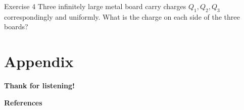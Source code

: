 \documentclass{beamer}
\begin{document}
\begin{frame}{Exercise 4}
Three infinitely large metal board carry charges $Q_1, Q_2, Q_3$ correspondingly 
and uniformly. What is the charge on each side of the three boards? 

\begin{figure}[H]
	\centering
\end{figure}
\end{frame}





\section{Appendix}

\begin{frame}
    \begin{center}
        \LARGE\bf Thank for listening!
    \end{center}
	
\end{frame}


\begin{frame}{\bf References}
	\nocite{*} %
	
	
\end{frame}
\end{document}
